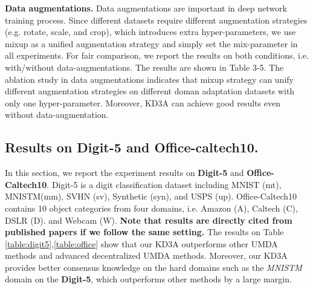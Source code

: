 \documentclass{article}
\begin{document}
\textbf{Data augmentations.} Data augmentations are important in deep network training process. Since different datasets require different augmentation strategies (e.g. rotate, scale, and crop), which introduces extra hyper-parameters, we use mixup \citep{DBLP:conf/iclr/ZhangCDL18} as a unified augmentation strategy and simply set the mix-parameter  in all experiments. For fair comparison, we report the results on both conditions, i.e. with/without data-augmentations. The results are shown in Table 3-5. The ablation study in data augmentations indicates that mixup strategy can unify different augmentation strategies on different doman adaptation datasets with only one hyper-parameter. Moreover, KD3A can achieve good results even without data-augmentation. 
\subsection{Results on Digit-5 and Office-caltech10.}

In this section, we report the experiment results on \textbf{Digit-5} and \textbf{Office-Caltech10}. Digit-5 is a digit classification dataset including MNIST (mt), MNISTM(mm), SVHN (sv), Synthetic (syn), and USPS (up). Office-Caltech10 contains 10 object categories from four domains, i.e. Amazon (A), Caltech (C), DSLR (D). and Webcam (W). \textbf{Note that results are directly cited from published papers if we follow the same setting.} The results on Table \ref{table:digit5},\ref{table:office} show that our KD3A outperforms other UMDA methods and advanced decentralized UMDA methods. Moreover, our KD3A provides better consensus knowledge on the hard domains such as the \textit{MNISTM} domain on the \textbf{Digit-5}, which outperforms other methods by a large margin. 
\end{document}
